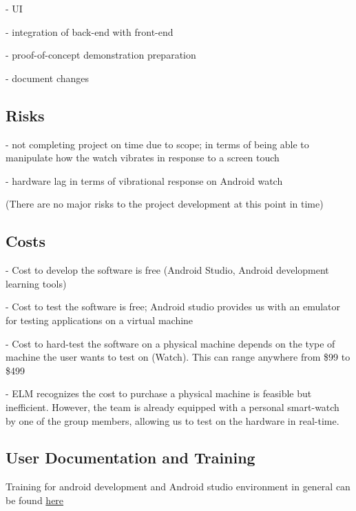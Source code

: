 \documentclass[12pt, titlepage]{article}
\begin{document}
- UI

- integration of back-end with front-end

\noindent - proof-of-concept demonstration preparation

\noindent - document changes

\subsection{Risks}

- not completing project on time due to scope; in terms of being able to manipulate how the watch vibrates in response to a screen touch

\noindent - hardware lag in terms of vibrational response on Android watch

\noindent (There are no major risks to the project development at this point in time)

\subsection{Costs}

- Cost to develop the software is free (Android Studio, Android development learning tools)

\noindent - Cost to test the software is free; Android studio provides us with an emulator for testing applications on a virtual machine

\noindent - Cost to hard-test the software on a physical machine depends on the type of machine the user wants to test on (Watch). This can range anywhere from \$99 to \$499

\noindent - ELM recognizes the cost to purchase a physical machine is feasible but inefficient. However, the team is already equipped with a personal smart-watch by one of the group members, allowing us to test on the hardware in real-time.

\subsection{User Documentation and Training}

Training for android development and Android studio environment in general can be found \href{https://developer.android.com/index.html}{here}




\end{document}
